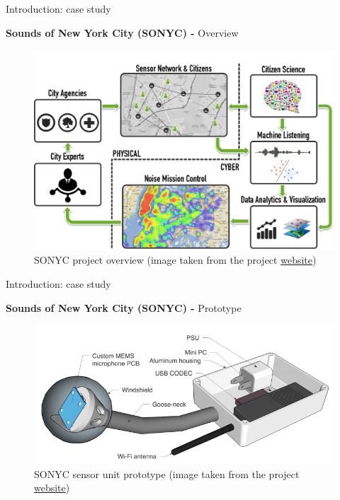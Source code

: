 \documentclass{beamer}
\newcommand{\myhref}[2]{{\color{blue}\href{#1}{#2}}}
\begin{document}
    \begin{frame}{Introduction: case study}
        
        {\bf Sounds of New York City (SONYC) - } Overview
        \vfill 
        \begin{center}
            \begin{figure}
                \includegraphics[scale=0.4]{figures/sonyc.png}
                \caption{SONYC project overview (image taken from the project \myhref{https://wp.nyu.edu/sonyc}{website})}
            \end{figure}
        \end{center}
    \end{frame}
    
    \begin{frame}{Introduction: case study}
        
        {\bf Sounds of New York City (SONYC) - } Prototype
        \vfill 
        \begin{center} 
            \begin{figure}
                \includegraphics[scale=0.5]{figures/sonyc_prototype}
                \caption{SONYC sensor unit prototype (image taken from the project \myhref{https://wp.nyu.edu/sonyc}{website})}
            \end{figure}
        \end{center}
    \end{frame}
    
\end{document}
